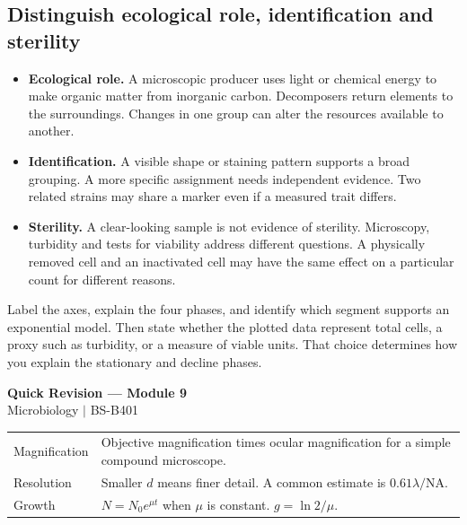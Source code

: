 \documentclass[12pt,a4paper]{article}
\renewcommand{\arraystretch}{1.45}
\begin{document}
\subsection{Distinguish ecological role, identification and sterility}
\begin{itemize}[leftmargin=*, itemsep=2pt]
  \item \textbf{Ecological role.} A microscopic producer uses light or chemical energy to make organic matter from inorganic carbon. Decomposers return elements to the surroundings. Changes in one group can alter the resources available to another.
  \item \textbf{Identification.} A visible shape or staining pattern supports a broad grouping. A more specific assignment needs independent evidence. Two related strains may share a marker even if a measured trait differs.
  \item \textbf{Sterility.} A clear-looking sample is not evidence of sterility. Microscopy, turbidity and tests for viability address different questions. A physically removed cell and an inactivated cell may have the same effect on a particular count for different reasons.
\end{itemize}

\begin{tcolorbox}[masonbox, title={Answer a growth-curve question in order}]
Label the axes, explain the four phases, and identify which segment supports an exponential model. Then state whether the plotted data represent total cells, a proxy such as turbidity, or a measure of viable units. That choice determines how you explain the stationary and decline phases.
\end{tcolorbox}

\newpage
\begin{center}
  {\large\bfseries\color{myred} Quick Revision --- Module 9}\\[3pt]
  {\small\color{mydark} Microbiology $|$ BS-B401}
\end{center}
\noindent{\color{myred}\rule{\linewidth}{1.2pt}}\par\vspace{4pt}

\begin{tcolorbox}[formulabox, title={Key Concepts at a Glance}]
\renewcommand{\arraystretch}{1.35}
\noindent\begin{tabularx}{\linewidth}{B{4.5cm}Y}
Magnification & Objective magnification times ocular magnification for a simple compound microscope. \\[3pt]
Resolution & Smaller $d$ means finer detail. A common estimate is $0.61\lambda/\mathrm{NA}$. \\[3pt]
Growth & $N=N_0e^{\mu t}$ when $\mu$ is constant. $g=\ln 2/\mu$. \\[3pt]
\end{tabularx}\par
\end{tcolorbox}
\end{document}
